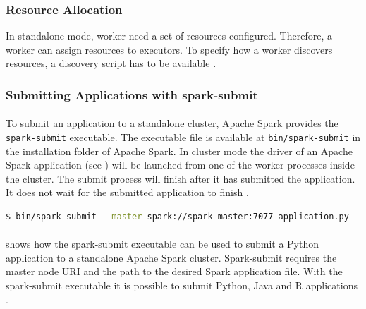 \subsubsection{Resource Allocation}
\label{subsubsec:04_spark_standalone_res-alloc}
In standalone mode, worker need a set of resources configured. Therefore, a worker can assign resources to executors.
To specify how a worker discovers resources, a discovery script has to be available \cite{Apache2020Spark}.


\subsubsection{Submitting Applications with spark-submit}
\label{subsubsec:04_spark_standalone_submit}
\paragraph{}To submit an application to a standalone cluster, Apache Spark provides the \texttt{spark-submit} executable. The executable file is available at \texttt{bin/spark-submit} in the installation folder of Apache Spark.
In cluster mode the driver of an Apache Spark application (see ) will be launched from one of the worker processes inside the cluster.
The submit process will finish after it has submitted the application. It does not wait for the submitted application to finish \cite{Apache2020Spark}.


\begin{lstlisting}[label=lst:04_spark_standalone_submit_example, caption=Example usage of the spark-submit executable, language=bash]
$ bin/spark-submit --master spark://spark-master:7077 application.py
\end{lstlisting}


\paragraph{} shows how the spark-submit executable can be used to submit a Python application to a standalone Apache Spark cluster.
Spark-submit requires the master node URI and the path to the desired Spark application file.
With the spark-submit executable it is possible to submit Python, Java and R applications \cite{Apache2020Spark}.


